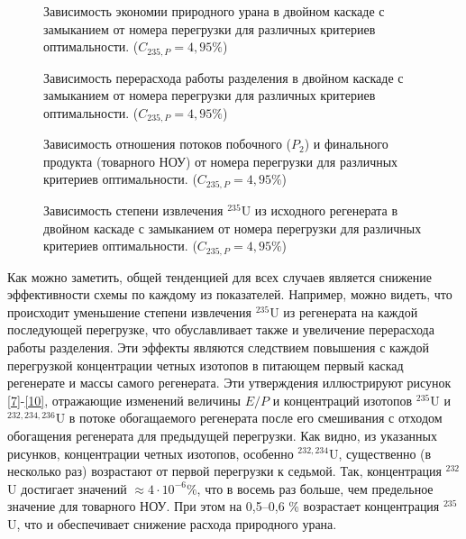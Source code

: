 \begin{figure}[ht]
    \centering
    \begin{minipage}{.5\textwidth}
      \centering
      
      \caption{{Зависимость экономии природного урана в двойном каскаде с замыканием от номера перегрузки для различных критериев оптимальности. ($C_{235,{P}}=4,95\%$){\label{3}}}}
    \end{minipage}%
    \begin{minipage}{.5\textwidth}
        \centering
        
  \caption{{Зависимость перерасхода работы разделения в двойном каскаде с замыканием от номера перегрузки для различных критериев оптимальности. ($C_{235,{P}}=4,95\%$){\label{6}}}}
  \end{minipage}
\end{figure}

\begin{figure}[ht]
    \centering
    \begin{minipage}{.51\textwidth}
      \centering
      
      \caption{{Зависимость отношения потоков побочного ($P_2$) и финального продукта (товарного НОУ) от  номера перегрузки для различных критериев оптимальности. ($C_{235,{P}}=4,95\%$){\label{5}}}}
    \end{minipage}%
    \begin{minipage}{.5\textwidth}
        \centering
        
    \caption{{Зависимость степени извлечения $^{235}$U из исходного регенерата в двойном каскаде с замыканием от номера перегрузки для различных критериев оптимальности. ($C_{235,{P}}=4,95\%$){\label{4}}}}
    \end{minipage}
\end{figure}

Как можно заметить, общей тенденцией для всех случаев является снижение эффективности схемы по каждому из показателей.
Например, можно видеть, что происходит уменьшение степени извлечения $^{235}$U из регенерата на каждой последующей перегрузке, что обуславливает также и увеличение перерасхода работы разделения.
Эти эффекты являются следствием повышения с каждой перегрузкой концентрации четных изотопов в питающем первый каскад регенерате и массы самого регенерата.
Эти утверждения иллюстрируют рисунок \ref{7}-\ref{10}, отражающие изменений величины $E/P$ и концентраций изотопов $^{235}$U и $^{232,234,236}$U в потоке обогащаемого регенерата после его смешивания с отходом обогащения регенерата для предыдущей перегрузки.
Как видно, из указанных рисунков, концентрации четных изотопов, особенно $^{232,234}$U, существенно (в несколько раз) возрастают от первой перегрузки к седьмой. Так, концентрация $^{232}$U достигает значений $\approx 4\cdot10^{-6} \%$, что в восемь раз больше, чем предельное значение для товарного НОУ. При этом на 0,5--0,6 \% возрастает концентрация $^{235}$U, что и обеспечивает снижение расхода природного урана.      

